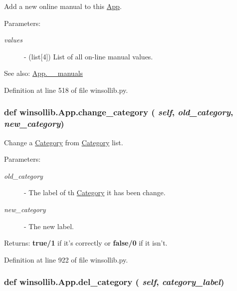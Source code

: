 Add a new online manual to this \hyperlink{classwinsollib_1_1App}{App}. 

\begin{Desc}
\item[Parameters:]
\begin{description}
\item[{\em values}]- (list\mbox{[}4\mbox{]}) List of all on-line manual values.\end{description}
\end{Desc}
\begin{Desc}
\item[See also:]\hyperlink{classwinsollib_1_1App_1af4cfd72ef4f2e4ce69304a2aa34b5f}{App.\_\-\_\-manuals} \end{Desc}


Definition at line 518 of file winsollib.py.\hypertarget{classwinsollib_1_1App_6c0f9ce54f06a1bef99632ae7b409d55}{
\subsubsection[change\_\-category]{\setlength{\rightskip}{0pt plus 5cm}def winsollib.App.change\_\-category ( {\em self},  {\em old\_\-category},  {\em new\_\-category})}}
\label{classwinsollib_1_1App_6c0f9ce54f06a1bef99632ae7b409d55}


Change a \hyperlink{classwinsollib_1_1Category}{Category} from \hyperlink{classwinsollib_1_1Category}{Category} list. 

\begin{Desc}
\item[Parameters:]
\begin{description}
\item[{\em old\_\-category}]- The label of th \hyperlink{classwinsollib_1_1Category}{Category} it has been change. \item[{\em new\_\-category}]- The new label. \end{description}
\end{Desc}
\begin{Desc}
\item[Returns:]{\bf true/1} if it's correctly or {\bf false/0} if it isn't. \end{Desc}


Definition at line 922 of file winsollib.py.\hypertarget{classwinsollib_1_1App_dc8477f5dbe87f5805d5571cb5197ea3}{
\subsubsection[del\_\-category]{\setlength{\rightskip}{0pt plus 5cm}def winsollib.App.del\_\-category ( {\em self},  {\em category\_\-label})}}
\label{classwinsollib_1_1App_dc8477f5dbe87f5805d5571cb5197ea3}


